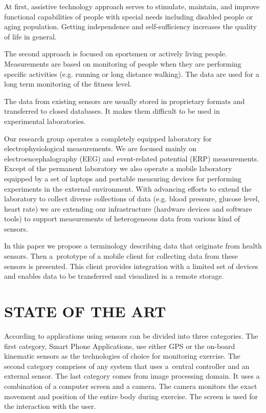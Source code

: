\documentclass[a4paper,twoside]{article}
\begin{document}
At first, assistive technology approach serves to stimulate, maintain, and improve functional capabilities of people with special needs including disabled people or aging population. Getting independence and self-sufficiency increases the quality of life in general.

The second approach is focused on sportsmen or actively living people. Measurements are based on monitoring of people when they are performing specific activities (e.g. running or long distance walking). The data are used for a long term monitoring of the fitness level.

The data from existing sensors are usually stored in proprietary formats and transferred to closed databases. It makes them difficult to be used in experimental laboratories.

Our research group operates a completely equipped laboratory \cite{10.3389/fninf.2014.00020} for electrophysiological measurements. We are focused mainly on electroencephalography (EEG) and event-related potential (ERP) measurements. Except of the permanent laboratory we also operate a mobile laboratory equipped by a set of laptops and portable measuring devices for performing experiments in the external environment. With advancing efforts to extend the laboratory to collect diverse collections of data (e.g. blood pressure, glucose level, heart rate) we are extending our infrastructure (hardware devices and software tools) to support  measurements of heterogeneous data from various kind of sensors.

In this paper we propose a terminology describing data that originate from health sensors. Then a~prototype of a mobile client for collecting data from these sensors is presented. This client provides integration with a limited set of devices and enables data to be transferred and visualized in a remote storage.

\section{\uppercase{state of the art}}
\label{sec:state-of-the-art}

\noindent
According to \cite{Lowe2012242} applications using sensors can be divided into three categories. The first category, Smart Phone Applications, use either GPS or the
on-board kinematic sensors as the technologies of choice for monitoring exercise. The second category comprises of any system that uses a~central controller
and an external sensor. The last category comes from image processing domain. It uses a combination of a computer screen and a camera. The camera monitors the exact movement and position of the entire body during exercise. The screen is used for the interaction with the user.
\end{document}
